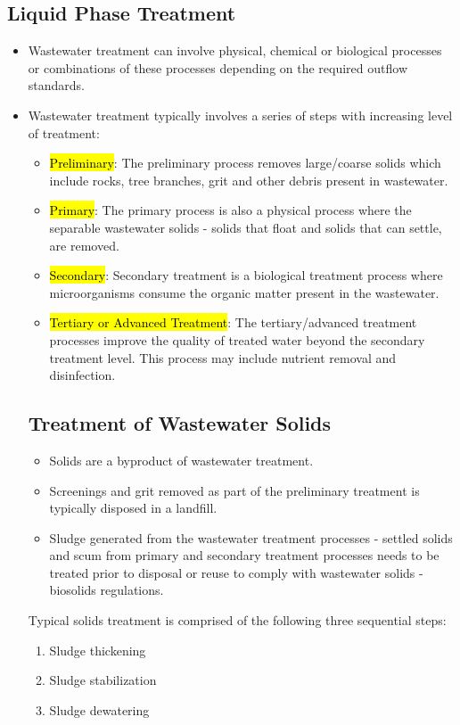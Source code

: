 \subsection{Liquid Phase Treatment}
\begin{itemize}
\item Wastewater treatment can involve physical, chemical or biological processes or combinations of these processes depending on the required outflow standards. 
\item Wastewater treatment typically involves a series of steps with increasing level of treatment:
\begin{itemize}
\item \hl{Preliminary}:  The preliminary process removes large/coarse solids which include rocks, tree branches, grit and other debris present in wastewater.
\item \hl{Primary}:  The primary process is also a physical process where the separable wastewater solids - solids that float and solids that can settle, are removed.  
\item \hl{Secondary}:  Secondary treatment is a biological treatment process where microorganisms consume the organic matter present in the wastewater. 
\item \hl{Tertiary or Advanced Treatment}:  The tertiary/advanced treatment processes improve the quality of treated water beyond the secondary treatment level.  This process may include nutrient removal and disinfection.
\end{itemize}

\subsection{Treatment of Wastewater Solids}
\begin{itemize}
\item Solids are a byproduct of wastewater treatment.  
\item Screenings and grit removed as part of the preliminary treatment is typically disposed in a landfill.
\item Sludge generated from the wastewater treatment processes -  settled solids and scum from primary and secondary treatment processes needs to be treated prior to disposal or reuse to comply with wastewater solids - biosolids regulations.
\end{itemize}

\vspace{0.5cm}
Typical solids treatment is comprised of the following three sequential steps:
\begin{enumerate}
\item Sludge thickening
\item Sludge stabilization
\item Sludge dewatering
\end{enumerate}
\vspace{0.5cm}

\end{itemize}
